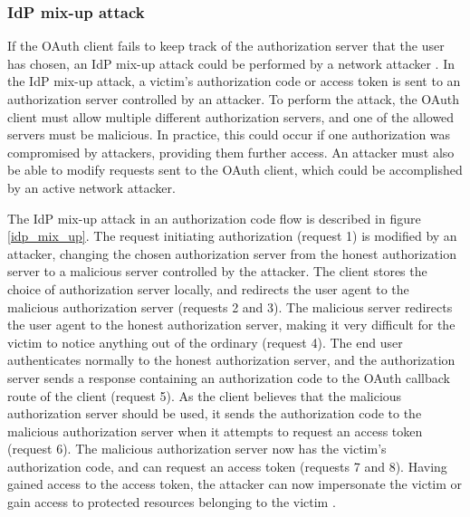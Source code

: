 



\subsubsection{IdP mix-up attack}
\label{sec:vulnerabilities-idp}

If the OAuth client fails to keep track of the authorization server that the user has chosen, an IdP mix-up attack could be performed by a network attacker \citep{fett_comprehensive_2016}.
In the IdP mix-up attack, a victim's authorization code or access token is sent to an authorization server controlled by an attacker.
To perform the attack, the OAuth client must allow multiple different authorization servers, and one of the allowed servers must be malicious.
In practice, this could occur if one authorization was compromised by attackers, providing them further access.
An attacker must also be able to modify requests sent to the OAuth client, which could be accomplished by an active network attacker.

The IdP mix-up attack in an authorization code flow is described in figure \ref{idp_mix_up}.
The request initiating authorization (request 1) is modified by an attacker, changing the chosen authorization server from the honest authorization server to a malicious server controlled by the attacker.
The client stores the choice of authorization server locally, and redirects the user agent to the malicious authorization server (requests 2 and 3).
The malicious server redirects the user agent to the honest authorization server, making it very difficult for the victim to notice anything out of the ordinary (request 4).
The end user authenticates normally to the honest authorization server, and the authorization server sends a response containing an authorization code to the OAuth callback route of the client (request 5).
As the client believes that the malicious authorization server should be used, it sends the authorization code to the malicious authorization server when it attempts to request an access token (request 6).
The malicious authorization server now has the victim's authorization code, and can request an access token (requests 7 and 8).
Having gained access to the access token, the attacker can now impersonate the victim or gain access to protected resources belonging to the victim \citep{tonetta_security_2017}.


